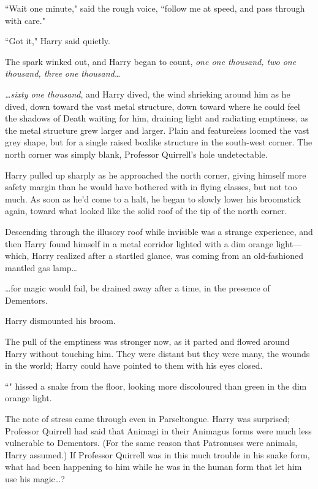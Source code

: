 ``Wait one minute," said the rough voice, ``follow me at speed, and pass through with care."

``Got it," Harry said quietly.

The spark winked out, and Harry began to count, \emph{one one thousand, two one thousand, three one thousand{\ldots}}

\emph{{\ldots}sixty one thousand}, and Harry dived, the wind shrieking around him as he dived, down toward the vast metal structure, down toward where he could feel the shadows of Death waiting for him, draining light and radiating emptiness, as the metal structure grew larger and larger. Plain and featureless loomed the vast grey shape, but for a single raised boxlike structure in the south-west corner. The north corner was simply blank, Professor Quirrell's hole undetectable.

Harry pulled up sharply as he approached the north corner, giving himself more safety margin than he would have bothered with in flying classes, but not too much. As soon as he'd come to a halt, he began to slowly lower his broomstick again, toward what looked like the solid roof of the tip of the north corner.

Descending through the illusory roof while invisible was a strange experience, and then Harry found himself in a metal corridor lighted with a dim orange light—which, Harry realized after a startled glance, was coming from an old-fashioned mantled gas lamp{\ldots}

{\ldots}for magic would fail, be drained away after a time, in the presence of Dementors.

Harry dismounted his broom.

The pull of the emptiness was stronger now, as it parted and flowed around Harry without touching him. They were distant but they were many, the wounds in the world; Harry could have pointed to them with his eyes closed.

``" hissed a snake from the floor, looking more discoloured than green in the dim orange light.

The note of stress came through even in Parseltongue. Harry was surprised; Professor Quirrell had said that Animagi in their Animagus forms were much less vulnerable to Dementors. (For the same reason that Patronuses were animals, Harry assumed.) If Professor Quirrell was in this much trouble in his snake form, what had been happening to him while he was in the human form that let him use his magic{\ldots}?

